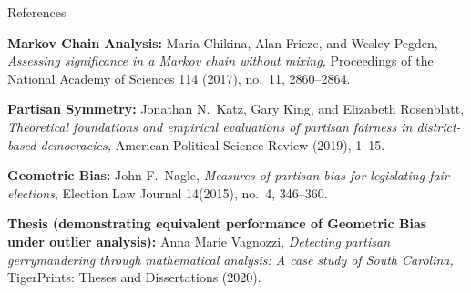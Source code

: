 \documentclass[xcolor=dvipsnames,table]{beamer}
\theoremstyle{plain}
\theoremstyle{definition}
\begin{document}
\begin{frame}{References}

	\textcolor{MYpurple}{\scriptsize \textbf{Markov Chain Analysis:} Maria Chikina, Alan Frieze, and Wesley Pegden, \textit{Assessing significance in a Markov chain without mixing,} Proceedings of the National Academy of Sciences 114 (2017), no.\ 11, 2860--2864.}

\vspace{2mm}
	\textcolor{MYpurple}{\scriptsize \textbf{Partisan Symmetry:} Jonathan N.\ Katz, Gary King, and Elizabeth Rosenblatt, \textit{Theoretical foundations and empirical evaluations of partisan fairness in district-based democracies,} American Political Science Review (2019), 1--15.}

\vspace{2mm}	
	\textcolor{MYpurple}{\scriptsize \textbf{Geometric Bias:} John F.\ Nagle, \textit{Measures of partisan bias for legislating fair elections}, Election Law Journal 14(2015), no.\ 4, 346--360.}
	
	\vspace{2mm}
	
	\textcolor{MYpurple}{\scriptsize \textbf{Thesis (demonstrating equivalent performance of Geometric Bias under outlier analysis):} Anna Marie Vagnozzi, \textit{Detecting partisan gerrymandering through mathematical analysis: A case study of South Carolina,} TigerPrints: Theses and Dissertations (2020).}

\end{frame}

\end{document}
